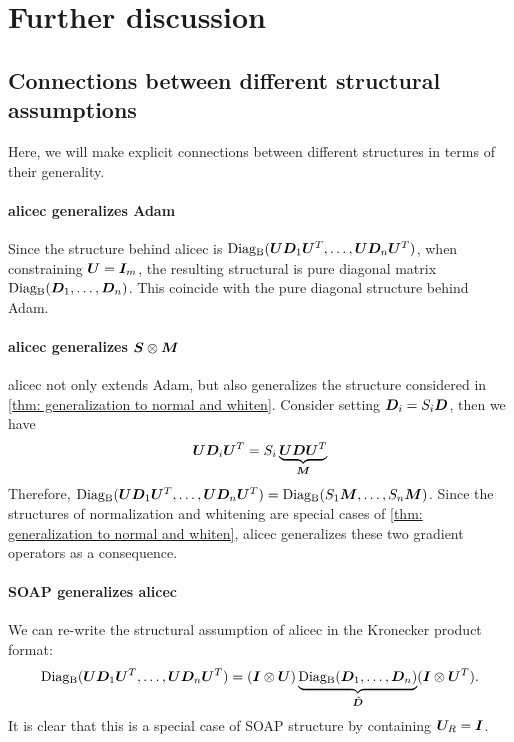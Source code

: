 \section{Further discussion}
\label{app: further discussion}
\subsection{Connections between different structural assumptions}
\label{subapp: connections between structural assumptions}
Here, we will make explicit connections between different structures in terms of their generality.

\paragraph{\gls{alicec} generalizes Adam} Since the structure behind \gls{alicec} is $\operatorname{Diag_B}({\bm{U}}{\bm{D}}_1{\bm{U}}^T,\ldots,{\bm{U}}{\bm{D}}_n{\bm{U}}^T)$, when constraining ${\bm{U}}={\bm{I}}_m$, the resulting structural is pure diagonal matrix $\operatorname{Diag_B}({\bm{D}}_1,\ldots,{\bm{D}}_n)$. This coincide with the pure diagonal structure behind Adam.

\paragraph{\gls{alicec} generalizes ${\bm{S}}\otimes {\bm{M}}$} \gls{alicec} not only extends Adam, but also generalizes the structure considered in \cref{thm: generalization to normal and whiten}. Consider setting ${\bm{D}}_i = S_i{\bm{D}}$, then we have
\begin{align*}
    {\bm{U}}{\bm{D}}_i{\bm{U}}^T = S_i\underbrace{{\bm{U}}{\bm{D}}{\bm{U}}^T}_{{\bm{M}}}
\end{align*}
Therefore, $\operatorname{Diag_B}({\bm{U}}{\bm{D}}_1{\bm{U}}^T,\ldots, {\bm{U}}{\bm{D}}_n{\bm{U}}^T) = \operatorname{Diag_B}(S_1{\bm{M}},\ldots,S_n{\bm{M}})$. Since the structures of normalization and whitening are special cases of \cref{thm: generalization to normal and whiten}, \gls{alicec} generalizes these two gradient operators as a consequence.  

\paragraph{SOAP generalizes \gls{alicec}} We can re-write the structural assumption of \gls{alicec} in the Kronecker product format:
\begin{align*}
    \operatorname{Diag_B}({\bm{U}}{\bm{D}}_1{\bm{U}}^T,\ldots, {\bm{U}}{\bm{D}}_n{\bm{U}}^T) = ({\bm{I}}\otimes {\bm{U}})\underbrace{\operatorname{Diag_B}({\bm{D}}_1,\ldots,{\bm{D}}_n)}_{\tilde{{\bm{D}}}}({\bm{I}}\otimes {\bm{U}}^T).
\end{align*}
It is clear that this is a special case of SOAP structure by containing ${\bm{U}}_R={\bm{I}}$. 

